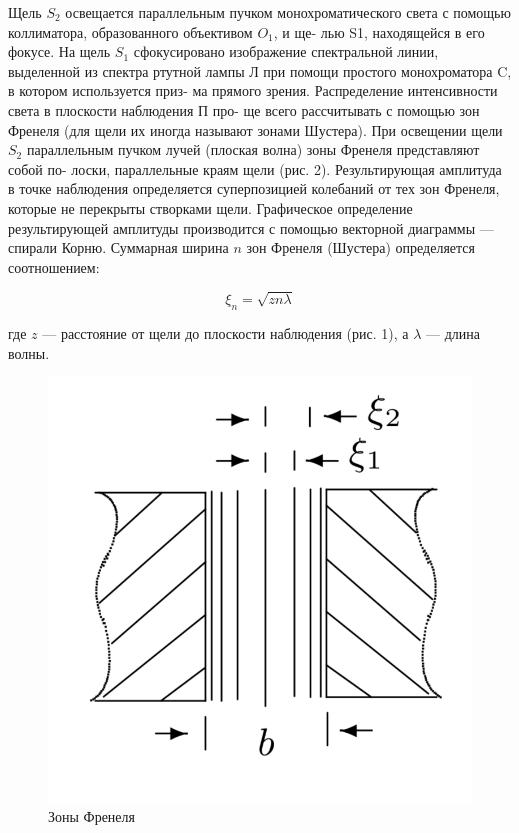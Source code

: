 Щель $ S_2 $ освещается параллельным пучком монохроматического
света с помощью коллиматора, образованного объективом $ O_1 $, и ще-
лью S1, находящейся в его фокусе. На щель $ S_1 $ сфокусировано изображение спектральной линии, выделенной из спектра ртутной лампы Л
при помощи простого монохроматора C, в котором используется приз-
ма прямого зрения.
Распределение интенсивности света в плоскости наблюдения П про-
ще всего рассчитывать с помощью зон Френеля (для щели их иногда
называют зонами Шустера). При освещении щели $ S_2 $ параллельным пучком лучей (плоская волна) зоны Френеля представляют собой по-
лоски, параллельные краям щели (рис. 2). Результирующая амплитуда
в точке наблюдения определяется суперпозицией колебаний от тех зон
Френеля, которые не перекрыты створками щели. Графическое определение результирующей амплитуды производится с помощью векторной
диаграммы --- спирали Корню. Суммарная ширина $ n $ зон Френеля (Шустера) определяется соотношением:

\begin{equation}\label{xin}
\xi_n = \sqrt{zn\lambda}
\end{equation}

где $ z $ --- расстояние от щели до плоскости наблюдения (рис. 1), а $ \lambda $ --- длина волны.

\begin{figure} 
	\includegraphics[width=\linewidth]{pics/zone}
	\caption{Зоны Френеля}
	\label{zone}
\end{figure}

